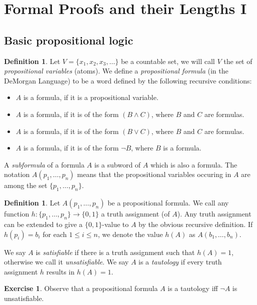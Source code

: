 \documentclass{article}
\theoremstyle{definition}
\newtheorem{excs}[thrm]{Exercise}
\newtheorem{defi}[thrm]{Definition}
\begin{document}
\section*{Formal Proofs and their Lengths I}

\subsection*{Basic propositional logic}

\begin{defi}
    Let $V=\{x_1,x_2, x_3, \dots\}$ be a countable set, we will call $V$ the set of \emph{propositional variables} (atoms). We define a \emph{propositional formula} (in the DeMorgan Language) to be a word defined by the following recursive conditions:
    \begin{itemize}
        \item $A$ is a formula,  if it is a propositional variable.
        \item $A$ is a formula, if it is of the form $(B \land C)$, where $B$ and $C$ are formulas.
        \item $A$ is a formula, if it is of the form $(B \lor C)$, where $B$ and $C$ are formulas.
        \item $A$ is a formula, if it is of the form $\lnot B$, where $B$ is a formula.
    \end{itemize}
    A \emph{subformula} of a formula $A$ is a subword of $A$ which is also a formula. The notation $A(p_1,\dots,p_n)$ means that the propositional variables occuring in $A$ are among the set $\{p_1,\dots,p_n\}$.
\end{defi}

\begin{defi}
    Let $A(p_1,\dots,p_n)$ be a propositional formula. We call any function $h:\{p_1,\dots,p_n\}\to \{0,1\}$ a truth assignment (of $A$). Any truth assignment can be extended to give a $\{0,1\}$-value to $A$ by the obvious recursive definition. If $h(p_i)=b_i$ for each $1\leq i\leq n$, we denote the value $h(A)$ as $A(b_1,\dots,b_n)$. 
    
    We say $A$ is \emph{satisfiable} if there is a truth assignment such that $h(A)=1$, otherwise we call it \emph{unsatisfiable}.
    We say $A$ is a \emph{tautology} if every truth assignment $h$ results in $h(A)=1$. 
\end{defi}

\begin{excs}
    Observe that a propositional formula $A$ is a tautology iff $\lnot A$ is unsatisfiable.
\end{excs}
\end{document}
